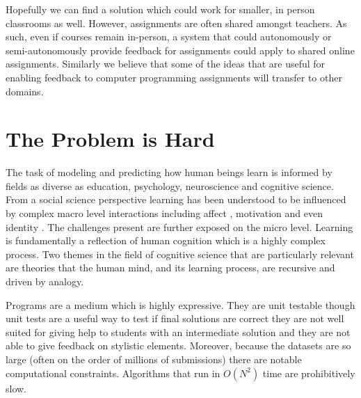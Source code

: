 Hopefully we can find a solution which could work for smaller, in person classrooms as well. However, assignments are often shared amongst teachers. As such, even if courses remain in-person, a system that could autonomously or semi-autonomously provide feedback for assignments could apply to shared online assignments. Similarly we believe that some of the ideas that are useful for enabling feedback to computer programming assignments will transfer to other domains.	

\section{The Problem is Hard}

The task of modeling and predicting how human beings learn is informed by fields as diverse
as education, psychology, neuroscience and cognitive science. From a social science perspective
learning has been understood to be influenced by complex macro level interactions including affect \cite{}
, motivation \cite{} and even identity \cite{}. The challenges present are further exposed on the micro
level. Learning is fundamentally a reflection of human cognition which is a highly complex process.
Two themes in the field of cognitive science that are particularly relevant are theories that the human
mind, and its learning process, are recursive and driven by analogy.

Programs are a medium which is highly expressive. They are unit testable though unit tests are a useful way to test if final solutions are correct they are not well suited for giving help to students with an intermediate solution and they are not able to give feedback on stylistic elements. Moreover, because the datasets are so large (often on the order of millions of submissions) there are notable computational constraints. Algorithms that run in $O(N^2)$ time are prohibitively slow.


